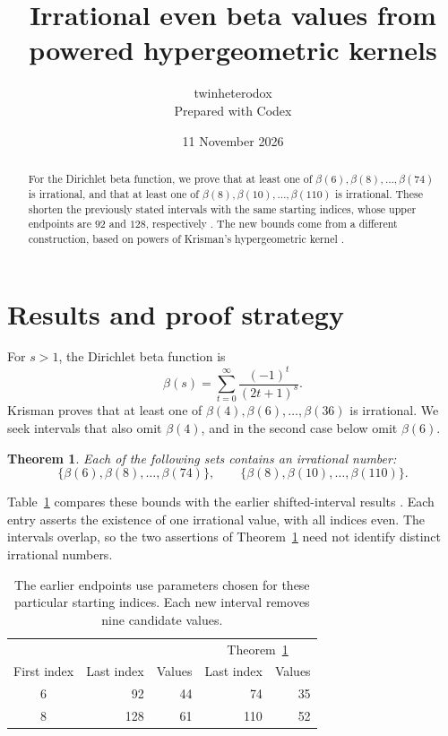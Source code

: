 \documentclass[11pt]{article}
\title{Irrational even beta values from powered hypergeometric kernels}
\author{twinheterodox\\[2pt]\normalsize Prepared with Codex}
\date{11 November 2026}
\newtheorem{theorem}{Theorem}
\begin{document}
\maketitle

\begin{abstract}
For the Dirichlet beta function, we prove that at least one of
$\beta(6),\beta(8),\ldots,\beta(74)$ is irrational, and that at least one
of $\beta(8),\beta(10),\ldots,\beta(110)$ is irrational. These shorten the
previously stated intervals with the same starting indices, whose upper
endpoints are $92$ and $128$, respectively \cite[Section 8.2]{shifted}.
The new bounds come from a different construction, based on powers of
Krisman's hypergeometric kernel \cite{krisman}.
\end{abstract}

\section{Results and proof strategy}\label{sec:introduction}
For $s>1$, the Dirichlet beta function is
\[
 \beta(s)=\sum_{t=0}^{\infty}\frac{(-1)^t}{(2t+1)^s}.
\]
Krisman \cite[Theorem 1.1]{krisman} proves that at least one of
$\beta(4),\beta(6),\ldots,\beta(36)$ is irrational. We seek intervals
that also omit $\beta(4)$, and in the second case below omit $\beta(6)$.

\begin{theorem}\label{thm:main}
Each of the following sets contains an irrational number:
\[
 \{\beta(6),\beta(8),\ldots,\beta(74)\},\qquad
 \{\beta(8),\beta(10),\ldots,\beta(110)\}.
\]
\end{theorem}

Table~\ref{tab:comparison} compares these bounds with the earlier
shifted-interval results \cite{shifted}. Each entry asserts the existence of
one irrational value, with all indices even. The intervals overlap, so
the two assertions of Theorem~\ref{thm:main} need not identify distinct
irrational numbers.
\begin{table}[ht]
\centering
\begin{tabular}{crrrr}\toprule
 & \multicolumn{2}{c}{\cite[Section 8.2]{shifted}} &
   \multicolumn{2}{c}{Theorem~\ref{thm:main}}\\
First index & Last index & Values & Last index & Values\\\midrule
6 & 92 & 44 & 74 & 35\\
8 & 128 & 61 & 110 & 52\\\bottomrule
\end{tabular}
\caption{The earlier endpoints use parameters chosen for these particular
starting indices. Each new interval removes nine candidate values.}
\label{tab:comparison}
\end{table}
\end{document}
